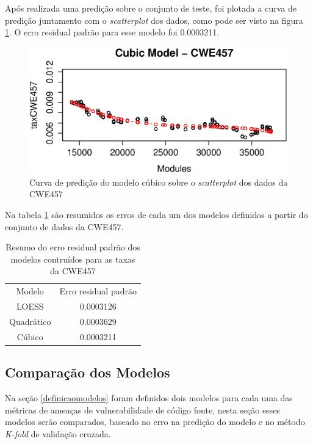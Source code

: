 Após realizada uma predição sobre o conjunto de teste, foi plotada a curva de
predição juntamento com o \textit{scatterplot} dos dados, como pode ser visto na
figura \ref{fig:cwe457-cubic}. O erro residual padrão para esse modelo foi
0.0003211.

\begin{figure}[h]
  \centering
  \includegraphics[width=1.0\textwidth]
      {figuras/cwe457-cubic.eps}
      \caption{Curva de predição do modelo cúbico sobre o \textit{scatterplot}
      dos dados da CWE457}
  \label{fig:cwe457-cubic}
\end{figure}

Na tabela \ref{tab:cwe457-erros} são resumidos os erros de cada um dos modelos
definidos a partir do conjunto de dados da CWE457.

\begin{table}[h]
 \centering
 \begin{tabular}{cc}
  \rowcolor[HTML]{EFEFEF} 
  {Modelo} & {Erro residual padrão} \\
  {LOESS}  & 0.0003126                  \\
  Quadrático   & 0.0003629                  \\
  Cúbico       & 0.0003211                 
 \end{tabular}
 \caption{Resumo do erro residual padrão dos modelos contruídos para as taxas da
 CWE457}
 \label{tab:cwe457-erros}
\end{table}

\subsection{Comparação dos Modelos}\label{comparacaomodelos}

Na seção \ref{definicaomodelos} foram definidos dois modelos para cada uma das
métricas de ameaças de vulnerabilidade de código fonte, nesta seção esses
modelos serão comparados, baseado no erro na predição do modelo e no método
\textit{K-fold} de validação cruzada.

